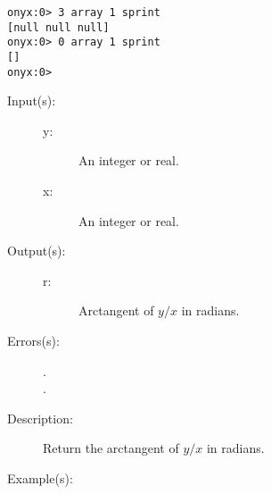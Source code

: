 \begin{description}
\begin{description}
\begin{verbatim}
onyx:0> 3 array 1 sprint
[null null null]
onyx:0> 0 array 1 sprint
[]
onyx:0>
		\end{verbatim}
	\end{description}
\label{systemdict:atan}
\item[{\onyxop{y x}{atan}{r}}: ]
	\begin{description}\item[]
	\item[Input(s): ]
		\begin{description}\item[]
		\item[y: ]
			An integer or real.
		\item[x: ]
			An integer or real.
		\end{description}
	\item[Output(s): ]
		\begin{description}\item[]
		\item[r: ]
			Arctangent of $y/x$ in radians.
		\end{description}
	\item[Errors(s): ]
		\begin{description}\item[]
		\item[.]
		\item[.]
		\end{description}
	\item[Description: ]
		Return the arctangent of $y/x$ in radians.
	\item[Example(s): ]\begin{verbatim}


\end{verbatim}
\end{description}
\end{description}
